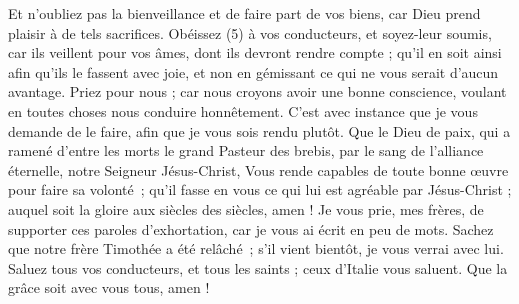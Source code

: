 \begin{multicols}{2}
Et n'oubliez pas la bienveillance et de faire part de vos biens, car Dieu prend plaisir à de tels sacrifices.
Obéissez (5) à vos conducteurs, et soyez-leur soumis, car ils veillent pour vos âmes, dont ils devront rendre compte ; qu’il en soit ainsi afin qu’ils le fassent avec joie, et non en gémissant ce qui ne vous serait d’aucun avantage.
Priez pour nous ; car nous croyons avoir une bonne conscience, voulant en toutes choses nous conduire honnêtement.
C’est avec instance que je vous demande de le faire, afin que je vous sois rendu plutôt.
Que le Dieu de paix, qui a ramené d'entre les morts le grand Pasteur des brebis, par le sang de l'alliance éternelle, notre Seigneur Jésus-Christ,
Vous rende capables de toute bonne œuvre pour faire sa volonté ; qu’il fasse en vous ce qui lui est agréable par Jésus-Christ ; auquel soit la gloire aux siècles des siècles, amen !
Je vous prie, mes frères, de supporter ces paroles d'exhortation, car je vous ai écrit en peu de mots.
Sachez que notre frère Timothée a été relâché ; s'il vient bientôt, je vous verrai avec lui.
Saluez tous vos conducteurs, et tous les saints ; ceux d'Italie vous saluent.
Que la grâce soit avec vous tous, amen !
\PPE{}
\end{multicols}